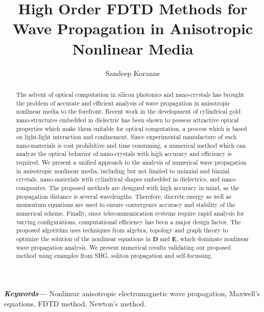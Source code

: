 \documentclass{article}[12pt]
\providecommand{\keywords}[1]{\textbf{\textit{Keywords---}} #1}
\theoremstyle{plain}
\begin{document}
\title{High Order FDTD Methods for 
Wave Propagation in Anisotropic Nonlinear Media}
\author{Sandeep Koranne}
\maketitle
\begin{abstract}
The advent of optical computation in 
silicon photonics and nano-crystals has brought the problem of accurate
and efficient analysis of wave propagation in anisotropic nonlinear media to the forefront.
Recent work in the development of cylindrical gold nano-structures embedded in dielectric
has been shown to possess attractive optical properties which make them suitable for optical
computation,  a process which is based on light-light interaction and confinement.
Since experimental manufacture of such nano-materials is cost prohibitive and time consuming, a
numerical method which can analyze the optical behavior of nano-crystals with high accuracy and
efficiency is required.
We present a unified approach to the analysis of numerical wave
propagation in anisotropic nonlinear media, including but not 
limited to uniaxial and biaxial crystals, nano-materials with cylindrical
shapes embedded in dielectrics, and nano-composites. The proposed methods are designed with high accuracy
in mind, as the propagation distance is several wavelengths.
Therefore, discrete energy as well as momentum equations are used
to ensure convergence accuracy and stability of the numerical scheme.
Finally, since telecommunication systems require rapid analysis for
varying configurations, computational efficiency has been a major
design factor. The proposed algorithm uses techniques from algebra,
topology and graph theory to optimize the solution of the nonlinear
equations in $\mathbf{D}$ and $\mathbf{E}$, which dominate nonlinear
wave propagation analysis.
We present numerical results
validating our proposed method using examples from SHG, soliton propagation and self-focussing.
\end{abstract}
\keywords{
Nonlinear anisotropic electromagnetic wave propagation, Maxwell's equations, FDTD method, Newton's method.}
\end{document}
